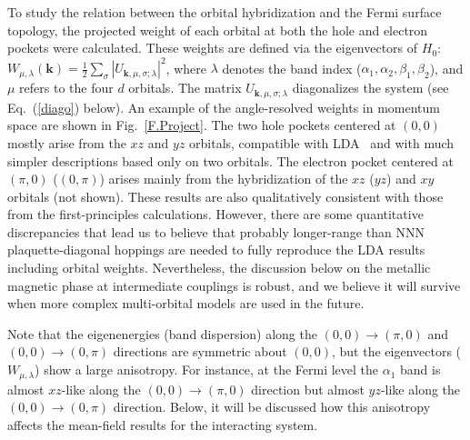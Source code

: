 \documentclass[aps,prb,superscriptaddress,preprintnumbers,
showpacs,legalpaper,twoside,twocolumn,amsmath,amssymb]{revtex4}
\begin{document}
To study the relation between the orbital hybridization and the Fermi surface topology,
the projected weight of each orbital at both the hole and
electron pockets were calculated. These weights are defined via the eigenvectors
of $H_0$: $W_{\mu,\lambda} (\mathbf{k}) =
\frac{1}{2} \sum_\sigma |U_{\mathbf{k},\mu,\sigma;\lambda}|^2$,
where $\lambda$ denotes the band index ($\alpha_1, \alpha_2,
\beta_1, \beta_2$), and $\mu$ refers to the four $d$ orbitals. The matrix
$U_{\mathbf{k},\mu,\sigma;\lambda}$ diagonalizes the system (see Eq.~(\ref{diago}) below).
An example of the angle-resolved weights in momentum space are shown in
Fig.~\ref{F.Project}. The two hole pockets centered at
$(0,0)$ mostly arise from the $xz$ and $yz$ orbitals, compatible with LDA~\cite{singh,first, xu, cao, fang2} and with
much simpler descriptions
based only on two orbitals.\cite{scalapino,daghofer} The electron
pocket centered at $(\pi,0)$ ($(0,\pi)$) arises mainly from the
hybridization of the $xz$ ($yz$) and $xy$ orbitals (not shown). These results are also
qualitatively consistent with those from the first-principles
calculations.\cite{fang2} However, there are some quantitative discrepancies that lead us
to believe that probably longer-range than NNN
plaquette-diagonal hoppings are needed to fully reproduce the
LDA results including orbital weights. Nevertheless, the discussion below on the
metallic magnetic phase at intermediate couplings is robust,
and we believe it will survive when more complex
multi-orbital models are used in the future.


Note that the eigenenergies (band dispersion) along
the $(0,0)\rightarrow(\pi,0)$ and
$(0,0)\rightarrow(0,\pi)$ directions are symmetric about $(0,0)$, but the
eigenvectors ($W_{\mu,\lambda}$) show a large anisotropy. For
instance, at the Fermi level the $\alpha_1$ band is almost $xz$-like
along the $(0,0)\rightarrow(\pi,0)$ direction but almost $yz$-like
along the $(0,0)\rightarrow(0,\pi)$ direction. Below, it will be discussed how
this anisotropy affects the mean-field results for the
interacting system.
\end{document}
